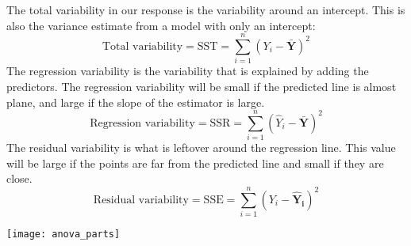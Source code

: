 The total variability in our response is the variability around an intercept. This
is also the variance estimate from a model with only an intercept:
\begin{equation}
    \text{Total variability} = \text{SST} = \sum_{i=1}^n (Y_i - \bm{\bar{Y}})^2
\end{equation}
The regression variability is the variability that is explained by adding the predictors.
The regression variability will be small if the predicted line is almost plane, and large if 
the slope of the estimator is large.
\begin{equation}
    \text{Regression variability} = \text{SSR} = \sum_{i=1}^n (\hat{Y}_i - \bm{\bar{Y}})^2
\end{equation}
The residual variability is what is leftover around the regression line. This value will be 
large if the points are far from the predicted line and small if they are close.
\begin{equation}
    \text{Residual variability} = \text{SSE} = \sum_{i=1}^n (Y_i - \bm{\hat{Y}_i})^2
\end{equation}

\texttt{[image: anova\_parts]}


